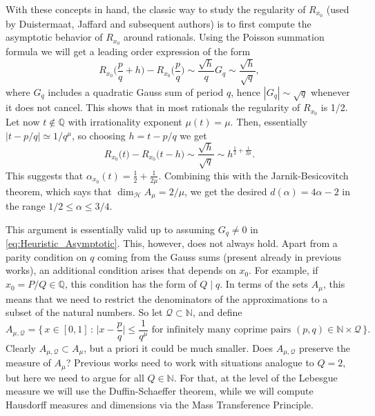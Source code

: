 \documentclass[11pt,reqno]{amsart}
\theoremstyle{definition}
\begin{document}
With these concepts in hand, 
the classic way to study the regularity of $R_{x_0}$ (used by Duistermaat, Jaffard and subsequent authors) is to first compute the asymptotic behavior of $R_{x_0}$ around rationals. 
Using the Poisson summation formula
we will get a leading order expression of the form
\begin{equation}\label{eq:Heuristic_Asymptotic}
 R_{x_0}\Big( \frac{p}{q} + h \Big) - R_{x_0}\Big( \frac{p}{q}\Big)   \sim \frac{\sqrt{h}}{q}G_q \sim \frac{\sqrt{h}}{\sqrt{q}},
\end{equation}
where  $G_q$ includes a quadratic Gauss sum of period $q$, hence $|G_q| \sim \sqrt q$ whenever it does not cancel.
This shows that in most rationals the regularity of $R_{x_0}$ is 1/2. 
Let now $t\not\in \mathbb Q$ with irrationality exponent $\mu(t) = \mu$. 
Then, essentially $|t - p/q| \simeq 1/q^{\mu}$, 
so choosing $h = t-p/q$ we get 
 \begin{equation}
 R_{x_0}\Big( t \Big) - R_{x_0}\Big( t - h \Big) 
\sim \frac{\sqrt{h}}{\sqrt{q}}
\sim h^{\frac12 + \frac{1}{2\mu}}.
\end{equation}
This suggests that $\alpha_{x_0}(t) = \frac12 + \frac{1}{2\mu}$. 
Combining this with the Jarnik-Besicovitch theorem, which says that $\dim_{\mathcal H } A_\mu = 2/\mu$, we get the desired $d(\alpha) = 4\alpha - 2$ in the range $1/2 \leq \alpha \leq 3/4$. 

This argument is essentially valid up to assuming $G_q \neq 0$ in \eqref{eq:Heuristic_Asymptotic}. 
This, however, does not always hold. 
Apart from a parity condition on $q$ coming from the Gauss sums (present already in previous works),
an additional condition arises that depends on $x_0$. 
For example, if $x_0 = P/Q \in \mathbb Q$, this condition has the form of $Q \mid q$. 
In terms of the sets $A_\mu$, 
this means that we need to restrict the denominators of the approximations to a subset of the natural numbers. 
So let $\mathcal Q \subset \mathbb N$, and define
\begin{equation}\label{eq:A_Mu_Q}
A_{\mu, \mathcal Q}
= \Big\{ \, x \in [0,1] \, : \, \Big| x - \frac{p}{q} \Big| \leq \frac{1}{q^\mu} \text{ for infinitely many coprime pairs } (p,q) \in \mathbb N \times \mathcal Q  \,   \Big\}.
\end{equation}
Clearly $A_{\mu, \mathcal Q} \subset A_\mu$,
but a priori it could be much smaller. 
Does $A_{\mu, \mathcal Q}$ preserve the measure of $A_\mu$?
Previous works need to work with situations analogue to $Q=2$, 
but here we need to argue for all $Q \in \mathbb N$. 
For that, at the level of the Lebesgue measure
we will use the Duffin-Schaeffer theorem, 
while we will compute Hausdorff measures and dimensions 
 via the Mass Transference Principle. 
\end{document}
